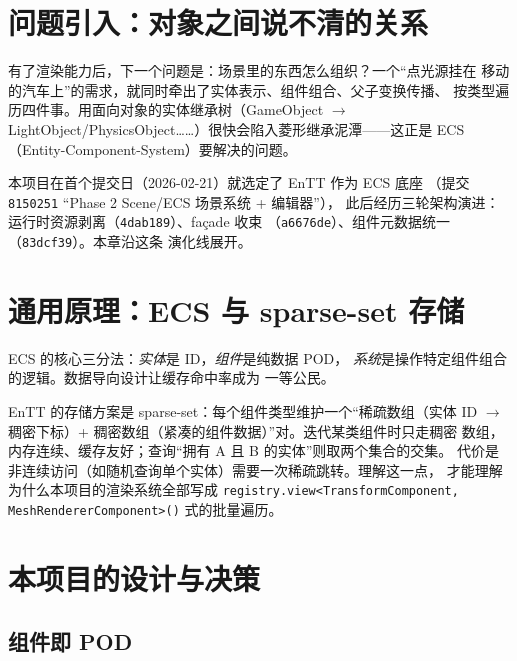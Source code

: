 \section{问题引入：对象之间说不清的关系}

有了渲染能力后，下一个问题是：场景里的东西怎么组织？一个``点光源挂在
移动的汽车上''的需求，就同时牵出了实体表示、组件组合、父子变换传播、
按类型遍历四件事。用面向对象的实体继承树（GameObject $\to$
LightObject/PhysicsObject……）很快会陷入菱形继承泥潭——这正是 ECS
（Entity-Component-System）要解决的问题。

本项目在首个提交日（2026-02-21）就选定了 EnTT 作为 ECS 底座
（提交 \texttt{8150251} ``Phase 2 Scene/ECS 场景系统 + 编辑器''），
此后经历三轮架构演进：运行时资源剥离（\texttt{4dab189}）、façade 收束
（\texttt{a6676de}）、组件元数据统一（\texttt{83dcf39}）。本章沿这条
演化线展开。

\section{通用原理：ECS 与 sparse-set 存储}

ECS 的核心三分法：\emph{实体}是 ID，\emph{组件}是纯数据 POD，
\emph{系统}是操作特定组件组合的逻辑。数据导向设计让缓存命中率成为
一等公民。

EnTT 的存储方案是 sparse-set：每个组件类型维护一个``稀疏数组（实体 ID
$\to$ 稠密下标）+ 稠密数组（紧凑的组件数据）''对。迭代某类组件时只走稠密
数组，内存连续、缓存友好；查询``拥有 A 且 B 的实体''则取两个集合的交集。
代价是非连续访问（如随机查询单个实体）需要一次稀疏跳转。理解这一点，
才能理解为什么本项目的渲染系统全部写成
\texttt{registry.view<TransformComponent, MeshRendererComponent>()}
式的批量遍历。

\section{本项目的设计与决策}

\subsection{组件即 POD}

